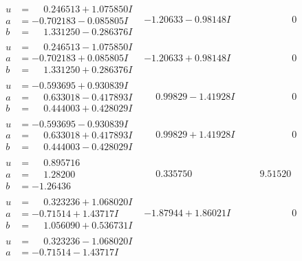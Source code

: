 \documentclass[1p]{elsarticle_modified}
\theoremstyle{definition}
\begin{document}
$$\begin{array}{c|c|c}
\begin{aligned}
u &= \phantom{-}0.246513 + 1.075850 I \\
a &= -0.702183 - 0.085805 I \\
b &= \phantom{-}1.331250 - 0.286376 I\end{aligned}
 & -1.20633 - 0.98148 I & \phantom{-0.000000 } 0 \\ \hline\begin{aligned}
u &= \phantom{-}0.246513 - 1.075850 I \\
a &= -0.702183 + 0.085805 I \\
b &= \phantom{-}1.331250 + 0.286376 I\end{aligned}
 & -1.20633 + 0.98148 I & \phantom{-0.000000 } 0 \\ \hline\begin{aligned}
u &= -0.593695 + 0.930839 I \\
a &= \phantom{-}0.633018 - 0.417893 I \\
b &= \phantom{-}0.444003 + 0.428029 I\end{aligned}
 & \phantom{-}0.99829 - 1.41928 I & \phantom{-0.000000 } 0 \\ \hline\begin{aligned}
u &= -0.593695 - 0.930839 I \\
a &= \phantom{-}0.633018 + 0.417893 I \\
b &= \phantom{-}0.444003 - 0.428029 I\end{aligned}
 & \phantom{-}0.99829 + 1.41928 I & \phantom{-0.000000 } 0 \\ \hline\begin{aligned}
u &= \phantom{-}0.895716\phantom{ +0.000000I} \\
a &= \phantom{-}1.28200\phantom{ +0.000000I} \\
b &= -1.26436\phantom{ +0.000000I}\end{aligned}
 & \phantom{-}0.335750\phantom{ +0.000000I} & \phantom{-}9.51520\phantom{ +0.000000I} \\ \hline\begin{aligned}
u &= \phantom{-}0.323236 + 1.068020 I \\
a &= -0.71514 + 1.43717 I \\
b &= \phantom{-}1.056090 + 0.536731 I\end{aligned}
 & -1.87944 + 1.86021 I & \phantom{-0.000000 } 0 \\ \hline\begin{aligned}
u &= \phantom{-}0.323236 - 1.068020 I \\
a &= -0.71514 - 1.43717 I \\

\end{aligned}
\end{array}$$
\end{document}
